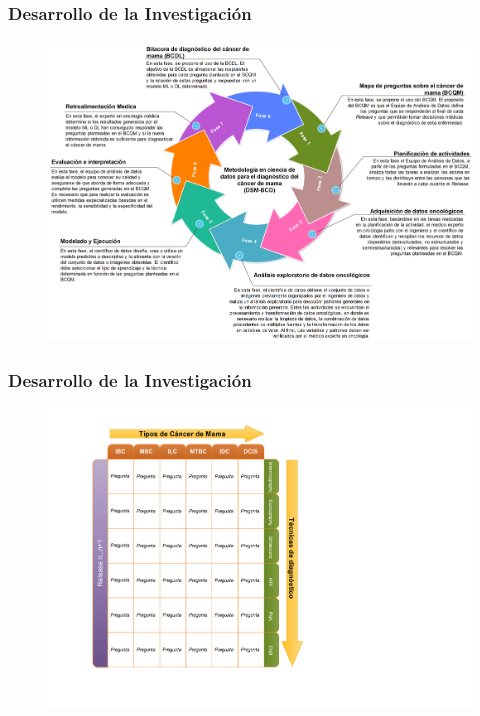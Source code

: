\documentclass[xcolor=dvipsnames,xcolor=table]{beamer} %
\begin{document}
\begin{frame}
	\frametitle{Desarrollo de la Investigación}
	\begin{figure}[h!]
		\centering
		\includegraphics[width=0.87\linewidth]{PROYECTO/imgs/DSM-BCD_SPANISH}
	\end{figure}
\end{frame}

\begin{frame}
	\frametitle{Desarrollo de la Investigación}
	\begin{figure}[h!]
		\centering
		\includegraphics[width=0.56\linewidth]{PROYECTO/imgs/BCQM_SPANISH}
	\end{figure}
\end{frame}
\end{document}
